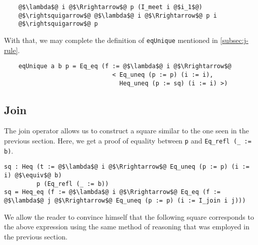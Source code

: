 \documentclass[12pt,twoside,maitrise]{dms}
\theoremstyle{definition}
\numberwithin{equation}{section}
\numberwithin{table}{chapter}
\numberwithin{figure}{chapter}
\newcommand\id[1] {\texttt{#1}}
\newcommand\fn[1] {\texttt{#1}}
\begin{document}
\begin{verbatim}
    @$\lambda$@ i @$\Rrightarrow$@ p (I_meet i @$i_1$@)
    @$\rightsquigarrow$@ @$\lambda$@ i @$\Rrightarrow$@ p i
    @$\rightsquigarrow$@ p
\end{verbatim}

With that, we may complete the definition of \id{eqUnique} mentioned in
\autoref{subsec:j-rule}.

\begin{verbatim}
    eqUnique a b p = Eq_eq (f := @$\lambda$@ i @$\Rrightarrow$@
                              < Eq_uneq (p := p) (i := i),
                                Heq_uneq (p := sq) (i := i) >)
\end{verbatim}


\subsection*{Join}

The join operator allows us to construct a square similar to the one seen in the
previous section. Here, we get a proof of equality between \id{p} and \fn{Eq_refl
  (_ := b)}.

\begin{verbatim}
sq : Heq (t := @$\lambda$@ i @$\Rrightarrow$@ Eq_uneq (p := p) (i := i) @$\equiv$@ b)
         p (Eq_refl (_ := b))
sq = Heq_eq (f := @$\lambda$@ i @$\Rrightarrow$@ Eq_eq (f := @$\lambda$@ j @$\Rrightarrow$@ Eq_uneq (p := p) (i := I_join i j)))
\end{verbatim}

We allow the reader to convince himself that the following square corresponds to
the above expression using the same method of reasoning that was employed in the
previous section.
\end{document}
